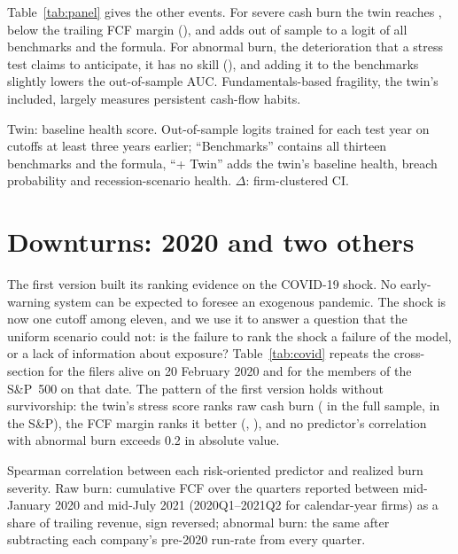 \documentclass[11pt]{article}
\begin{document}
Table~\ref{tab:panel} gives the other events. For severe cash burn the twin reaches \PanTwinAuc, below the trailing FCF margin (\PanFcfAuc), and adds \PanOosDelta{} out of sample to a logit of all benchmarks and the formula. For abnormal burn, the deterioration that a stress test claims to anticipate, it has no skill (\PanAbnTwinAuc), and adding it to the benchmarks slightly lowers the out-of-sample AUC. Fundamentals-based fragility, the twin's included, largely measures persistent cash-flow habits.

\begin{table}[t]
\centering\scriptsize
\caption{Distress events over the next eight quarters, 2014--2024}
\label{tab:panel}

\par\smallskip
\begin{minipage}{\linewidth}\footnotesize
Twin: baseline health score. Out-of-sample logits trained for each test year on cutoffs at least three years earlier; ``Benchmarks'' contains all thirteen benchmarks and the formula, ``+ Twin'' adds the twin's baseline health, breach probability and recession-scenario health. $\Delta$: firm-clustered CI.
\end{minipage}
\end{table}

\section{Downturns: 2020 and two others}\label{sec:covid}
The first version built its ranking evidence on the COVID-19 shock. No early-warning system can be expected to foresee an exogenous pandemic. The shock is now one cutoff among eleven, and we use it to answer a question that the uniform scenario could not: is the failure to rank the shock a failure of the model, or a lack of information about exposure? Table~\ref{tab:covid} repeats the cross-section for the \CovAllN{} filers alive on 20 February 2020 and for the \CovSpN{} members of the S\&P~500 on that date. The pattern of the first version holds without survivorship: the twin's stress score ranks raw cash burn (\CovAllTwin{} in the full sample, \CovSpTwin{} in the S\&P), the FCF margin ranks it better (\CovAllFcf, \CovSpFcf), and no predictor's correlation with abnormal burn exceeds 0.2 in absolute value.

\begin{table}[t]
\centering\scriptsize
\caption{2020--21 cash burn, predictors frozen on 20 February 2020}
\label{tab:covid}

\par\smallskip
\begin{minipage}{\linewidth}\footnotesize
Spearman correlation between each risk-oriented predictor and realized burn severity. Raw burn: cumulative FCF over the quarters reported between mid-January 2020 and mid-July 2021 (2020Q1--2021Q2 for calendar-year firms) as a share of trailing revenue, sign reversed; abnormal burn: the same after subtracting each company's pre-2020 run-rate from every quarter.
\end{minipage}
\end{table}
\end{document}
